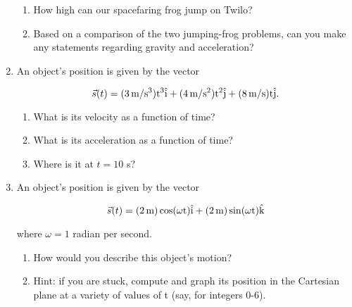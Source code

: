 \documentclass[12pt]{article}
\begin{document}
\begin{enumerate}
\begin{enumerate}
\item How high can our spacefaring frog jump on Twilo?
\item Based on a comparison of the two jumping-frog problems, can you make any statements regarding gravity and acceleration?
\end{enumerate}

\item An object's position is given by the vector 

$$\vec s(t) = (3\,\rm m/\rm s^3) t^3 \hat i + (4\, \rm m/\rm s^2) t^2 \hat j + (8\, \rm m/\rm s) t\hat j.$$

\begin{enumerate}
\item What is its velocity as a function of time?
\item What is its acceleration as a function of time?
\item Where is it at $t=10$ s?
\end{enumerate}

\item An object's position is given by the vector 

$$\vec s(t) = (2\, \rm m) \cos (\omega t) \hat i + (2\, \rm m) \sin (\omega t) \hat k$$

where $\omega = 1$ radian per second.

\begin{enumerate}
\item How would you describe this object's motion? 
\item Hint: if you are stuck, compute and graph its position in the Cartesian plane at a variety of values of t (say, for integers 0-6).
\end{enumerate}
\end{enumerate}
\end{document}

